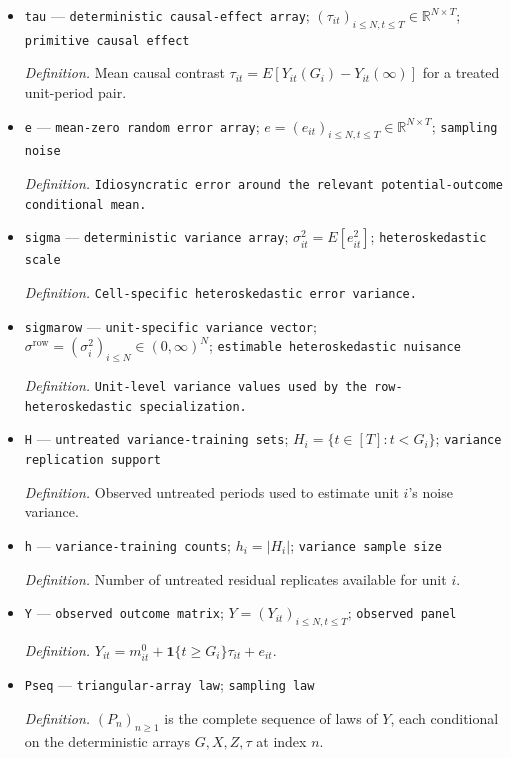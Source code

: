 \documentclass{article}
\begin{document}
\begin{itemize}
  \item \texttt{tau} --- \texttt{deterministic causal-\allowbreak{}effect array}; \((\tau_{it})_{i\le N,t\le T}\in\mathbb R^{N\times T}\); \texttt{primitive causal effect}
  \par\smallskip\noindent\emph{Definition.} Mean causal contrast \(\tau_{it}=E[Y_{it}(G_i)-Y_{it}(\infty)]\) for a treated unit-period pair.
  \item \texttt{e} --- \texttt{mean-\allowbreak{}zero random error array}; \(e=(e_{it})_{i\le N,t\le T}\in\mathbb R^{N\times T}\); \texttt{sampling noise}
  \par\smallskip\noindent\emph{Definition.} \texttt{Idiosyncratic error around the relevant potential-\allowbreak{}outcome conditional mean.}
  \item \texttt{sigma} --- \texttt{deterministic variance array}; \(\sigma_{it}^2=E[e_{it}^2]\); \texttt{heteroskedastic scale}
  \par\smallskip\noindent\emph{Definition.} \texttt{Cell-\allowbreak{}specific heteroskedastic error variance.}
  \item \texttt{sigmarow} --- \texttt{unit-\allowbreak{}specific variance vector}; \(\sigma^{\mathrm{row}}=(\sigma_i^{2})_{i\le N}\in(0,\infty)^N\); \texttt{estimable heteroskedastic nuisance}
  \par\smallskip\noindent\emph{Definition.} \texttt{Unit-\allowbreak{}level variance values used by the row-\allowbreak{}heteroskedastic specialization.}
  \item \texttt{H} --- \texttt{untreated variance-\allowbreak{}training sets}; \(H_i=\{t\in[T]:t<G_i\}\); \texttt{variance replication support}
  \par\smallskip\noindent\emph{Definition.} Observed untreated periods used to estimate unit \(i\)'s noise variance.
  \item \texttt{h} --- \texttt{variance-\allowbreak{}training counts}; \(h_i=|H_i|\); \texttt{variance sample size}
  \par\smallskip\noindent\emph{Definition.} Number of untreated residual replicates available for unit \(i\).
  \item \texttt{Y} --- \texttt{observed outcome matrix}; \(Y=(Y_{it})_{i\le N,t\le T}\); \texttt{observed panel}
  \par\smallskip\noindent\emph{Definition.} \(Y_{it}=m^0_{it}+\mathbf 1\{t\ge G_i\}\tau_{it}+e_{it}\).
  \item \texttt{Pseq} --- \texttt{triangular-\allowbreak{}array law}; \texttt{sampling law}
  \par\smallskip\noindent\emph{Definition.} \((P_n)_{n\ge1}\) is the complete sequence of laws of \(Y\), each conditional on the deterministic arrays \(G,X,Z,\tau\) at index \(n\).

\end{itemize}
\end{document}
